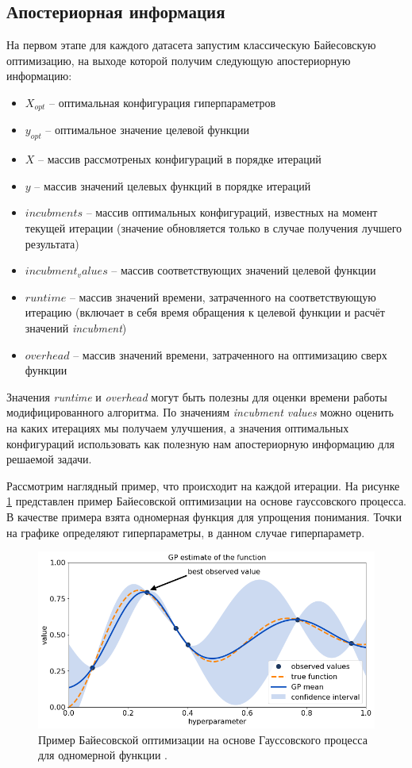 \documentclass[times,specification,annotation]{itmo-student-thesis}
\begin{document}
	\subsection{Апостериорная информация} 
	На первом этапе для каждого датасета запустим классическую Байесовскую оптимизацию, на выходе которой получим следующую апостериорную информацию: 
	\begin{itemize}
		\item $ X_{opt} $ -- оптимальная конфигурация гиперпараметров
		\item $ y_{opt} $ -- оптимальное значение целевой функции
		\item $ X $ -- массив рассмотреных конфигураций в порядке итераций
		\item $ y $ -- массив значений целевых функций в порядке итераций
		\item $ incubments $ -- массив оптимальных конфигураций, известных на момент текущей итерации (значение обновляется только в случае получения лучшего результата)
		\item $ incubment_values $ -- массив соответствующих значений целевой функции
		\item $ runtime $ -- массив значений времени, затраченного на соответствующую итерацию (включает в себя время обращения к целевой функции и расчёт значений \textit{incubment})
		\item $ overhead $ -- массив значений времени, затраченного на оптимизацию сверх функции
	\end{itemize}
	Значения \textit{runtime} и \textit{overhead} могут быть полезны для оценки времени работы модифицированного алгоритма. По значениям \textit{incubment values} можно оценить на каких итерациях мы получаем улучшения, а значения оптимальных конфигураций использовать как полезную нам апостериорную информацию для решаемой задачи. \par 
	Рассмотрим наглядный пример, что происходит на каждой итерации. На рисунке \ref{img:bogp} представлен пример Байесовской оптимизации на основе гауссовского процесса. В качестве примера взята одномерная функция для упрощения понимания. Точки на графике определяют гиперпараметры, в данном случае гиперпараметр. 
	\begin{figure}[!ht]
		\caption{Пример Байесовской оптимизации на основе Гауссовского процесса для одномерной функции \cite{kiss2019bayesian}.}\label{img:bogp}
		\includegraphics[width=0.85\linewidth]{bo_gp}
		\centering
	\end{figure}
\end{document}
